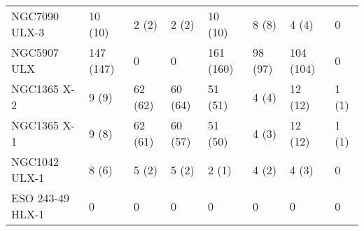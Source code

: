 \begin{tabular}{llllllll}
     NGC7090 ULX-3 &   10 (10) &     2 (2) &   2 (2) &   10 (10) &     8 (8) &     4 (4) &     0 \\
       NGC5907 ULX & 147 (147) &         0 &       0 & 161 (160) &   98 (97) & 104 (104) &     0 \\
       NGC1365 X-2 &     9 (9) &   62 (62) & 60 (64) &   51 (51) &     4 (4) &   12 (12) & 1 (1) \\
       NGC1365 X-1 &     9 (8) &   62 (61) & 60 (57) &   51 (50) &     4 (3) &   12 (12) & 1 (1) \\
     NGC1042 ULX-1 &     8 (6) &     5 (2) &   5 (2) &     2 (1) &     4 (2) &     4 (3) &     0 \\
  ESO 243-49 HLX-1 &         0 &         0 &       0 &         0 &         0 &         0 &     0 \\
\bottomrule
\end{tabular}
